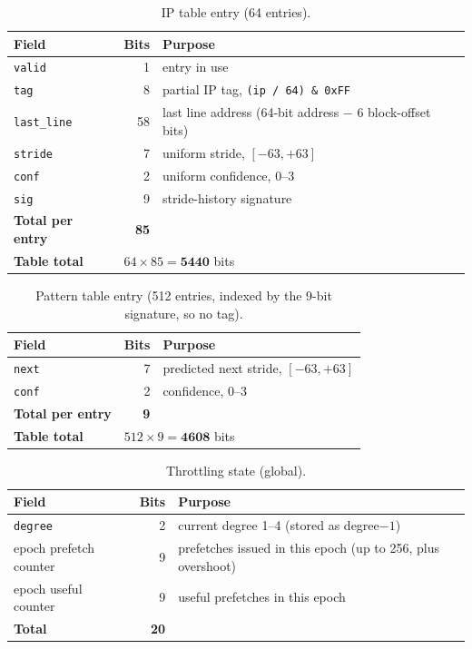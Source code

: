 \documentclass[11pt]{article}
\begin{document}
\begin{table}[H]
\centering
\caption{IP table entry (64 entries).}
\begin{tabular}{lrl}
\toprule
Field & Bits & Purpose \\
\midrule
\texttt{valid}     & 1  & entry in use \\
\texttt{tag}       & 8  & partial IP tag, \texttt{(ip / 64) \& 0xFF} \\
\texttt{last\_line}& 58 & last line address (64-bit address $-$ 6 block-offset bits) \\
\texttt{stride}    & 7  & uniform stride, $[-63,+63]$ \\
\texttt{conf}      & 2  & uniform confidence, 0--3 \\
\texttt{sig}       & 9  & stride-history signature \\
\midrule
\textbf{Total per entry} & \textbf{85} & \\
\textbf{Table total} & \multicolumn{2}{l}{$64 \times 85 = \mathbf{5440}$ bits} \\
\bottomrule
\end{tabular}
\end{table}

\begin{table}[H]
\centering
\caption{Pattern table entry (512 entries, indexed by the 9-bit signature, so no tag).}
\begin{tabular}{lrl}
\toprule
Field & Bits & Purpose \\
\midrule
\texttt{next} & 7 & predicted next stride, $[-63,+63]$ \\
\texttt{conf} & 2 & confidence, 0--3 \\
\midrule
\textbf{Total per entry} & \textbf{9} & \\
\textbf{Table total} & \multicolumn{2}{l}{$512 \times 9 = \mathbf{4608}$ bits} \\
\bottomrule
\end{tabular}
\end{table}

\begin{table}[H]
\centering
\caption{Throttling state (global).}
\begin{tabular}{lrl}
\toprule
Field & Bits & Purpose \\
\midrule
\texttt{degree}            & 2 & current degree 1--4 (stored as degree$-1$) \\
epoch prefetch counter     & 9 & prefetches issued in this epoch (up to 256, plus overshoot) \\
epoch useful counter       & 9 & useful prefetches in this epoch \\
\midrule
\textbf{Total} & \textbf{20} & \\
\bottomrule
\end{tabular}
\end{table}
\end{document}
